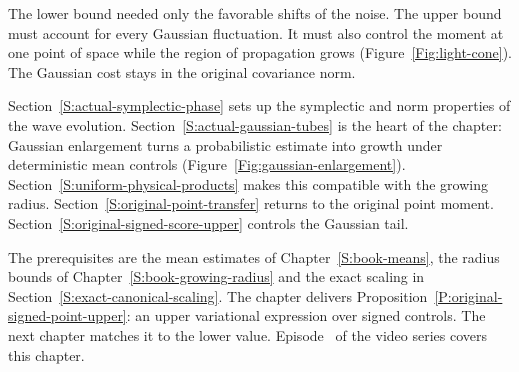 The lower bound needed only the favorable shifts of the noise. The upper
bound must account for every Gaussian fluctuation. It must also control
the moment at one point of space while the region of propagation grows
(Figure~\ref{Fig:light-cone}). The Gaussian cost stays in the original
covariance norm.

Section~\ref{S:actual-symplectic-phase} sets up the symplectic and norm
properties of the wave evolution. Section~\ref{S:actual-gaussian-tubes}
is the heart of the chapter: Gaussian enlargement turns
a probabilistic estimate into growth under deterministic
mean controls (Figure~\ref{Fig:gaussian-enlargement}).
Section~\ref{S:uniform-physical-products} makes this compatible with the
growing radius. Section~\ref{S:original-point-transfer} returns to the
original point moment. Section~\ref{S:original-signed-score-upper} controls
the Gaussian tail.

The prerequisites are the mean estimates of Chapter~\ref{S:book-means},
the radius bounds of Chapter~\ref{S:book-growing-radius} and the exact
scaling in Section~\ref{S:exact-canonical-scaling}. The chapter delivers
Proposition~\ref{P:original-signed-point-upper}: an upper variational
expression over signed controls. The next chapter matches it to the lower
value. Episode~ of the video series covers this
chapter.
